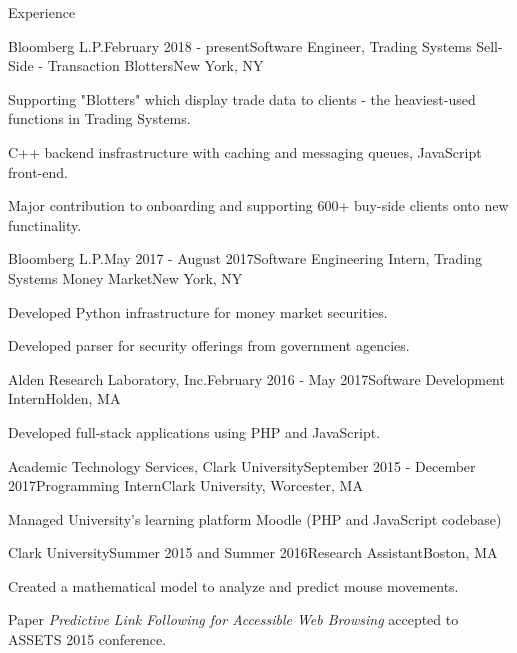 \documentclass{resume} %
\begin{document}
\begin{rSection}{Experience}


\begin{rSubsection}{Bloomberg L.P.}{February 2018 - present}{Software Engineer, Trading Systems Sell-Side - Transaction Blotters}{New York, NY}
\item Supporting "Blotters" which display trade data to clients - the heaviest-used functions in Trading Systems.
\item C++ backend insfrastructure with caching and messaging queues, JavaScript front-end.
\item Major contribution to onboarding and supporting 600+ buy-side clients onto new functinality.
\end{rSubsection}



\begin{rSubsection}{Bloomberg L.P.}{May 2017 - August 2017}{Software Engineering Intern, Trading Systems Money Market}{New York, NY}
\item Developed Python infrastructure for money market securities.
\item Developed parser for security offerings from government agencies.
\end{rSubsection}


\begin{rSubsection}{Alden Research Laboratory, Inc.}{February 2016 - May 2017}{Software Development Intern}{Holden, MA}
\item Developed full-stack applications using PHP and JavaScript.
\end{rSubsection}


\begin{rSubsection}{Academic Technology Services, Clark University}{September 2015 - December 2017}{Programming Intern}{Clark University, Worcester, MA}
\item Managed University's learning platform Moodle (PHP and JavaScript codebase)
\end{rSubsection}



\begin{rSubsection}{Clark University}{Summer 2015 and Summer 2016}{Research Assistant}{Boston, MA}
\item Created a mathematical model to analyze and predict mouse movements.
\item Paper \emph{Predictive Link Following for Accessible Web Browsing} accepted to ASSETS 2015 conference.
\end{rSubsection}


\end{rSection}
\end{document}
